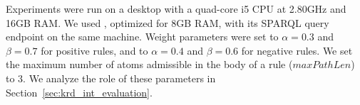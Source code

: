 Experiments were run on a desktop with a quad-core i5 CPU at 2.80GHz and 16GB RAM. We used , optimized for 8GB RAM, with its SPARQL query endpoint on the same machine.
Weight parameters %
were set to  $\alpha=0.3$ and $\beta=0.7$ for positive rules, and to $\alpha=0.4$ and $\beta=0.6$ for negative rules. 
We set the maximum number of atoms 
admissible in the body of a rule ($maxPathLen$) to $3$.
We analyze the role of these parameters in Section~\ref{sec:krd_int_evaluation}. 

